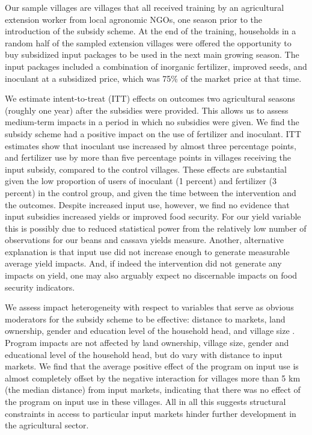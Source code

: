 Our sample villages are villages that all received training by an agricultural extension worker from local agronomic NGOs, one season prior to the introduction of the subsidy scheme. At the end of the training, households in a random half of the sampled extension villages were offered the opportunity to buy subsidized input packages to be used in the next main growing season. The input packages included a combination of inorganic fertilizer, improved seeds, and inoculant at a subsidized price, which was 75\% of the market price at that time.

We estimate intent-to-treat (ITT) effects on outcomes two agricultural seasons (roughly one year) after the subsidies were provided. This allows us to assess medium-term impacts in a period in which no subsidies were given. We find the subsidy scheme had a positive impact on the use of fertilizer and inoculant. ITT estimates show that inoculant use increased by almost three percentage points, and fertilizer use by more than five percentage points in villages receiving the input subsidy, compared to the control villages. These effects are substantial given the low proportion of users of inoculant (1 percent) and fertilizer (3 percent) in the control group, and given the time between the intervention and the outcomes. Despite increased input use, however, we find no evidence that input subsidies increased yields or improved food security. For our yield variable this is possibly due to reduced statistical power from the relatively low number of observations for our beans and cassava yields measure. Another, alternative explanation is that input use did not increase enough to generate measurable average yield impacts. And, if indeed the intervention did not generate any impacts on yield, one may also arguably expect no discernable impacts on food security indicators. 

We assess impact heterogeneity with respect to variables that serve as obvious moderators for the subsidy scheme to be effective: distance to markets, land ownership, gender and education level of the household head, and village size \citep[see e.g.][]{Jacoby2000,Fenske2011a,Ali2011,Magnan2015}. Program impacts are not affected by land ownership, village size, gender and educational level of the household head, but do vary with distance to input markets. We find that the average positive effect of the program on input use is almost completely offset by the negative interaction for villages more than 5 km (the median distance) from input markets, indicating that there was no effect of the program on input use in these villages. All in all this suggests structural constraints in access to particular input markets hinder further development in the agricultural sector.

